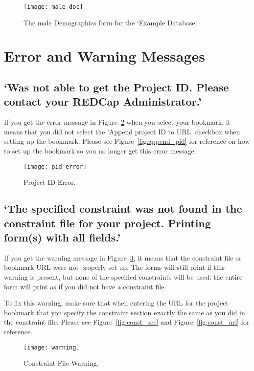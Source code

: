 \documentclass[12pt]{article}
\begin{document}
    \begin{figure}[H]
        \centering
        \texttt{[image: male\_doc]}
        \caption{The male Demographics form for the `Example Database'.}
        \label{fig:male_form}
    \end{figure}

\section{Error and Warning Messages}
\subsection{`Was not able to get the Project ID. Please contact your REDCap Administrator.'} 
If you get the error message in Figure~\ref{fig:pid_error} when you select your bookmark, it means that you did not select the 'Append project ID to URL' checkbox when setting up the bookmark. Please see Figure~\ref{fig:append_pid} for reference on how to set up the bookmark so you no longer get this error message.
    \begin{figure}[H]
        \centering
        \texttt{[image: pid\_error]}
        \caption{Project ID Error.}
       	\label{fig:pid_error}
   \end{figure}
\subsection{`The specified constraint was not found in the constraint file for your project. Printing form(s) with all fields.'}
If you get the warning message in Figure~\ref{fig:const_warning}, it means that the constraint file or bookmark URL were not properly set up. The forms will still print if this warning is present, but none of the specified constraints will be used; the entire form will print as if you did not have a constraint file.

To fix this warning, make sure that when entering the URL for the project bookmark that you specify the constraint section exactly the same as you did in the constraint file. Please see Figure~\ref{fig:const_sec} and Figure~\ref{fig:const_url} for reference.
    \begin{figure}[H]
        \centering
        \texttt{[image: warning]}
        \caption{Constraint File Warning.}
       	\label{fig:const_warning}
   \end{figure}
\end{document}
